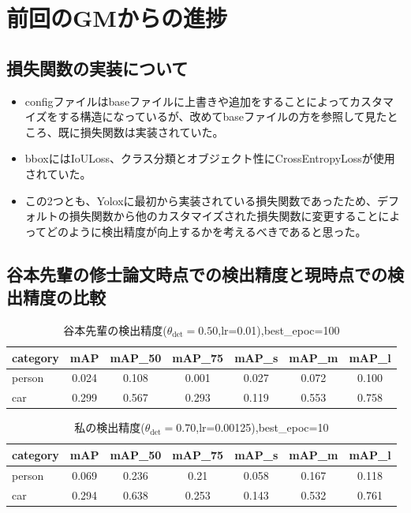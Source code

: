 \documentclass[a4j]{jarticle}
\begin{document}
	\section{前回のGMからの進捗}
	\subsection{損失関数の実装について}
	\begin{itemize}
		\item configファイルはbaseファイルに上書きや追加をすることによってカスタマイズをする構造になっているが、改めてbaseファイルの方を参照して見たところ、既に損失関数は実装されていた。
		\item bboxにはIoULoss、クラス分類とオブジェクト性にCrossEntropyLossが使用されていた。
		\item この2つとも、Yoloxに最初から実装されている損失関数であったため、デフォルトの損失関数から他のカスタマイズされた損失関数に変更することによってどのように検出精度が向上するかを考えるべきであると思った。
	\end{itemize}
	\subsection{谷本先輩の修士論文時点での検出精度と現時点での検出精度の比較}
	\begin{table}[htbp]
	\centering
	\caption{谷本先輩の検出精度($\theta_{\mathrm{det}}=0.50$,lr=0.01),best\_epoc=100}
		\begin{tabular}{lcccccc}
			\hline
			\textbf{category} & \textbf{mAP} & \textbf{mAP\_50} & \textbf{mAP\_75} & \textbf{mAP\_s} & \textbf{mAP\_m} & \textbf{mAP\_l} \\
			\hline
			person & 0.024 & 0.108 & 0.001 & 0.027 & 0.072 & 0.100 \\
			car    & 0.299 & 0.567 & 0.293 & 0.119 & 0.553 & 0.758 \\
			\hline
		\end{tabular}
	\end{table}

	\begin{table}[htbp]
	\centering
	\caption{私の検出精度($\theta_{\mathrm{det}}=0.70$,lr=0.00125),best\_epoc=10}
		\begin{tabular}{lcccccc}
			\hline
			\textbf{category} & \textbf{mAP} & \textbf{mAP\_50} & \textbf{mAP\_75} & \textbf{mAP\_s} & \textbf{mAP\_m} & \textbf{mAP\_l} \\
			\hline
			person & 0.069 & 0.236 & 0.21 & 0.058 &0.167 & 0.118 \\
			car    & 0.294 & 0.638 & 0.253 & 0.143 & 0.532 & 0.761 \\
			\hline
		\end{tabular}
	\end{table}
\end{document}
